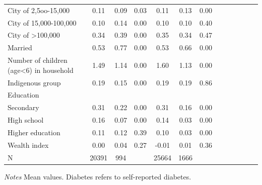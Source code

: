 \documentclass[12pt,english]{article}
\begin{document}
\begin{table}[!ht]
\begin{adjustbox}{max width=\linewidth, center}
\begin{threeparttable}
{\begin{tabular}{l*{6}{S S}}
					City of 2,5oo-15,000&        0.11&        0.09&        0.03&        0.11&        0.13&        0.00\\
					City of 15,000-100,000&        0.10&        0.14&        0.00&        0.10&        0.10&        0.40\\
					City of >100,000    &        0.34&        0.39&        0.00&        0.35&        0.34&        0.47\\
					Married             &        0.53&        0.77&        0.00&        0.53&        0.66&        0.00\\
					Number of children (age<6) in household&        1.49&        1.14&        0.00&        1.60&        1.13&        0.00\\
					Indigenous group    &        0.19&        0.15&        0.00&        0.19&        0.19&        0.86\\
					Education &&&&&& \\                    
					\hspace*{10mm}Secondary           &        0.31&        0.22&        0.00&        0.31&        0.16&        0.00\\
					\hspace*{10mm}High school         & 0.16&        0.07&        0.00&        0.14&        0.03&        0.00\\
					\hspace*{10mm}Higher education    & 0.11&        0.12&        0.39&        0.10&        0.03&        0.00\\
					Wealth index        &        0.00&        0.04&        0.27&       -0.01&        0.01&        0.36\\
					N &20391&994&&25664&1666&\\
					\bottomrule
				\end{tabular}
				\begin{tablenotes}
					\item \footnotesize \textit{Notes} Mean values. Diabetes refers to self-reported diabetes.
				\end{tablenotes}
			}
		\end{threeparttable}
	\end{adjustbox}
\end{table}
\clearpage
\end{document}
